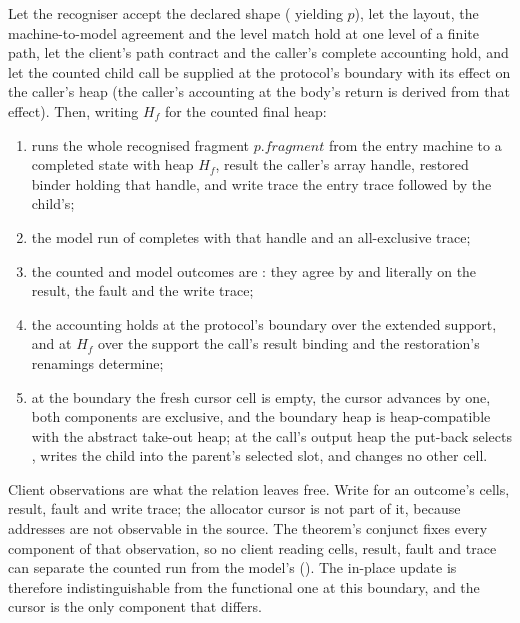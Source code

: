 \documentclass[a4paper,UKenglish,cleveref]{lipics-v2021}
\begin{document}
\begin{theorem}\label{thm:principal-fragment}
Let the recogniser accept the declared shape ( yielding $p$),
let the layout, the machine-to-model agreement  and the level
match hold at one level of a finite path, let the client's path contract and the
caller's complete accounting  hold, and let the
counted child call be supplied at the protocol's boundary with its
 effect on the caller's heap (the caller's accounting at the
body's return is derived from that effect). Then, writing $H_f$ for the counted
final heap:
\begin{enumerate}
\item {} runs the whole recognised fragment
$p.\mathit{fragment}$ from the entry machine to a completed state with heap $H_f$,
result the caller's array handle, restored binder holding that handle, and write
trace the entry trace followed by the child's;
\item the model run of  completes with
that handle and an all-exclusive trace;
\item the counted and model outcomes are : they agree
by  and literally on the result, the fault and the write trace;
\item the accounting holds at the protocol's boundary over the extended support,
and at $H_f$ over the support the call's result binding and the restoration's
renamings determine;
\item at the boundary the fresh cursor cell is empty, the cursor advances by one,
both components are exclusive, and the boundary heap is heap-compatible with the
abstract take-out heap; at the call's output heap the put-back selects
, writes the child into the parent's selected slot, and changes no
other cell.
\end{enumerate}
\end{theorem}

Client observations are what the relation leaves free. Write  for
an outcome's cells, result, fault and write trace; the allocator cursor is not
part of it, because addresses are not observable in the source. The theorem's
 conjunct fixes every component of that observation, so
no client reading cells, result, fault and trace can separate the counted run from
the model's (). The in-place update is
therefore indistinguishable from the functional one at this boundary, and the
cursor is the only component that differs.
\end{document}
